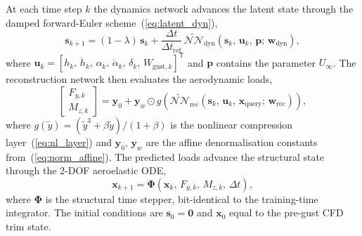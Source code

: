 At each time step $k$ the dynamics network advances the latent state through the damped
forward-Euler scheme~(\ref{eq:latent_dyn}),
\[
\mathbf{s}_{k+1} = (1-\lambda)\,\mathbf{s}_k
    + \frac{\Delta t}{\Delta t_\mathrm{ref}}\,
    \widetilde{\mathcal{NN}}_\mathrm{dyn}\!\left(
        \mathbf{s}_k,\, \mathbf{u}_k,\, \mathbf{p};\, \mathbf{w}_\mathrm{dyn}
    \right),
\]
where $\mathbf{u}_k = [h_k,\,\dot{h}_k,\,\alpha_k,\,\dot{\alpha}_k,\,\delta_k,\,
W_{\mathrm{gust},k}]^\mathsf{T}$ and $\mathbf{p}$ contains the parameter $U_\infty$.
The reconstruction network then evaluates the aerodynamic loads,
\[
\begin{bmatrix} F_{y,k} \\ M_{z,k} \end{bmatrix}
= \mathbf{y}_0 + \mathbf{y}_w \odot
    g\!\left(
        \widetilde{\mathcal{NN}}_\mathrm{rec}\!\left(
            \mathbf{s}_k,\, \mathbf{u}_k,\, \mathbf{x}_\mathrm{query};\,
            \mathbf{w}_\mathrm{rec}
        \right)
    \right),
\]
where $g(\tilde{y}) = (\tilde{y}^3 + \beta\tilde{y})/(1+\beta)$ is the nonlinear
compression layer~(\ref{eq:nl_layer}) and $\mathbf{y}_0$, $\mathbf{y}_w$ are the affine
denormalisation constants from~(\ref{eq:norm_affine}). The predicted loads advance the
structural state through the 2-DOF aeroelastic ODE,
\[
\mathbf{x}_{k+1} = \boldsymbol{\Phi}(\mathbf{x}_k,\, F_{y,k},\, M_{z,k},\, \Delta t),
\]
where $\boldsymbol{\Phi}$ is the structural time stepper, bit-identical to the
training-time integrator. The initial conditions are $\mathbf{s}_0 = \mathbf{0}$ and
$\mathbf{x}_0$ equal to the pre-gust CFD trim state.
